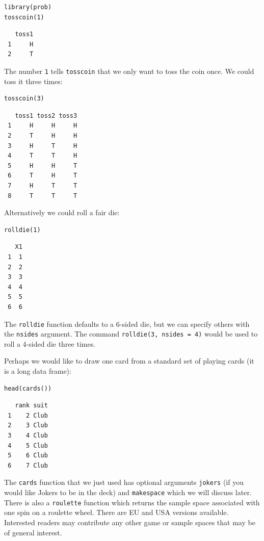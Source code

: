 \documentclass[captions=tableheading]{scrbook}
\begin{document}
\lstset{language=R}
\begin{lstlisting}
library(prob)
tosscoin(1)
\end{lstlisting}

\begin{verbatim}
   toss1
 1     H
 2     T
\end{verbatim}

The number \texttt{1} tells \texttt{tosscoin} that we only want to toss the coin once. We could toss it three times: 


\lstset{language=R}
\begin{lstlisting}
tosscoin(3)
\end{lstlisting}

\begin{verbatim}
   toss1 toss2 toss3
 1     H     H     H
 2     T     H     H
 3     H     T     H
 4     T     T     H
 5     H     H     T
 6     T     H     T
 7     H     T     T
 8     T     T     T
\end{verbatim}

Alternatively we could roll a fair die: 


\lstset{language=R}
\begin{lstlisting}
rolldie(1)
\end{lstlisting}

\begin{verbatim}
   X1
 1  1
 2  2
 3  3
 4  4
 5  5
 6  6
\end{verbatim}

The \texttt{rolldie} function defaults to a 6-sided die, but we can specify others with the \texttt{nsides} argument. The command \texttt{rolldie(3, nsides = 4)} would be used to roll a 4-sided die three times.

Perhaps we would like to draw one card from a standard set of playing cards (it is a long data frame):


\lstset{language=R}
\begin{lstlisting}
head(cards())
\end{lstlisting}

\begin{verbatim}
   rank suit
 1    2 Club
 2    3 Club
 3    4 Club
 4    5 Club
 5    6 Club
 6    7 Club
\end{verbatim}

The \texttt{cards} function that we just used has optional arguments \texttt{jokers} (if you would like Jokers to be in the deck) and \texttt{makespace} which we will discuss later. There is also a \texttt{roulette} function which returns the sample space associated with one spin on a roulette wheel. There are EU and USA versions available. Interested readers may contribute any other game or sample spaces that may be of general interest.
\end{document}
